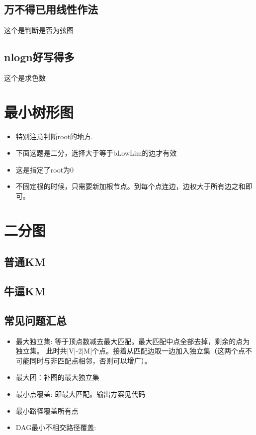 \documentclass[landscape]{report}
\newcommand{\includecode}[2][c]{}
\begin{document}
\begin{flushleft}
\begin{multicols}{2}
\subsection{ 万不得已用线性作法}
这个是判断是否为弦图
\includecode[c++]{zoj1015.cpp}
\subsection{ nlogn好写得多}
这个是求色数
\includecode[c++]{hnoi2008.cpp}

\section{最小树形图}
\paragraph{ }
\begin{itemize}
\item  特别注意判断root的地方.
\item 下面这题是二分，选择大于等于bLowLim的边才有效
\item 这是指定了root为0
\item 不固定根的时候，只需要新加根节点。到每个点连边，边权大于所有边之和即可。
\end{itemize}
\includecode[c++]{uva11865.cpp}
\section{二分图}
\subsection{ 普通KM}
\includecode[c++]{uva11383.cpp}
\subsection{ 牛逼KM}
\includecode[c++]{poj3565Better.cpp}
\subsection{ 常见问题汇总}
\begin{itemize}
\item 最大独立集: 等于顶点数减去最大匹配。最大匹配中点全部去掉，剩余的点为独立集。 此时共|V|-2|M|个点。接着从匹配边取一边加入独立集（这两个点不可能同时与非匹配点相邻，否则可以增广）。
\item 最大团：补图的最大独立集
\item 最小点覆盖: 即最大匹配。输出方案见代码
\item 最小路径覆盖所有点
\item DAG最小不相交路径覆盖:


\end{itemize}
\end{multicols}
\end{flushleft}
\end{document}
